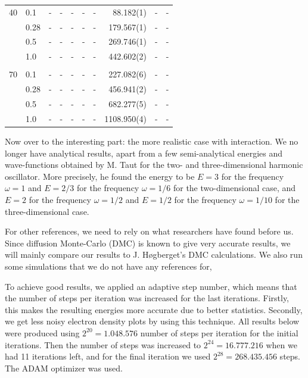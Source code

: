 \begin{landscape}
\begin{table} [H]
	\begin{tabularx}{\hsize}{l:l|RRRRRRRR}
		\label{tab:quantumdotswinteraction3D2}
		\\
		
		40 & 0.1 & - & - & - & - & - & 88.182(1) & - & - \\ 
		& 0.28 & - & - & - & - & - & 179.567(1) & - & - \\
		& 0.5 & - & - & - & - & - & 269.746(1) & - & - \\
		& 1.0 & - & - & - & - & - & 442.602(2) & - & - \\ \hdashline \\
		
		70 & 0.1 & - & - & - & - & - & 227.082(6) & - & - \\ 
		& 0.28 & - & - & - & - & - & 456.941(2) & - & - \\
		& 0.5 & - & - & - & - & - & 682.277(5) & - & - \\
		& 1.0 & - & - & - & - & - & 1108.950(4) & - & - \\ \hline\hline
	\end{tabularx}
\end{table}
\end{landscape}

Now over to the interesting part: the more realistic case with interaction. We no longer have analytical results, apart from a few semi-analytical energies and wave-functions obtained by M. Taut for the two- and three-dimensional harmonic oscillator. More precisely, he found the energy to be $E=3$ for the frequency $\omega=1$ and $E=2/3$ for the frequency $\omega=1/6$ for the two-dimensional case, and $E=2$ for the frequency $\omega=1/2$ and $E=1/2$ for the frequency $\omega=1/10$ for the three-dimensional case. \cite{taut_two_1993}\cite{taut_two_1994}

For other references, we need to rely on what researchers have found before us. Since diffusion Monte-Carlo (DMC) is known to give very accurate results, we will mainly compare our results to J. Høgberget's DMC calculations. \cite{hogberget_quantum_2013} We also run some simulations that we do not have any references for, 

To achieve good results, we applied an adaptive step number, which means that the number of steps per iteration was increased for the last iterations. Firstly, this makes the resulting energies more accurate due to better statistics. Secondly, we get less noisy electron density plots by using this technique. All results below were produced using $2^{20}=1.048.576$ number of steps per iteration for the initial iterations. Then the number of steps was increased to $2^{24}=16.777.216$ when we had 11 iterations left, and for the final iteration we used $2^{28}=268.435.456$ steps. The ADAM optimizer was used.

